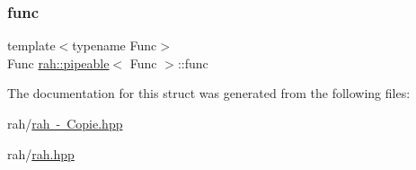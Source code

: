\subsubsection{\texorpdfstring{func}{func}}
{\footnotesize\ttfamily template$<$typename Func$>$ \\
Func \mbox{\hyperlink{structrah_1_1pipeable}{rah\+::pipeable}}$<$ Func $>$\+::func}



The documentation for this struct was generated from the following files\+:\begin{DoxyCompactItemize}
\item 
rah/\mbox{\hyperlink{rah_01-_01_copie_8hpp}{rah -\/ Copie.\+hpp}}\item 
rah/\mbox{\hyperlink{rah_8hpp}{rah.\+hpp}}\end{DoxyCompactItemize}
